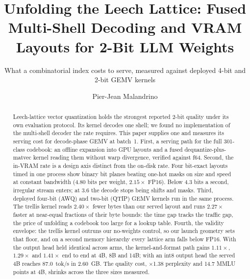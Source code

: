 \documentclass[acmsmall,screen=true,nonacm=true]{acmart}
\begin{document}
\title{Unfolding the Leech Lattice: Fused Multi-Shell Decoding and VRAM Layouts for 2-Bit LLM Weights}
\subtitle{What a combinatorial index costs to serve, measured against deployed 4-bit and 2-bit GEMV kernels}


\author{Pier-Jean Malandrino}

\renewcommand{\shortauthors}{Malandrino}

\begin{abstract}
Leech-lattice vector quantization holds the strongest reported 2-bit
quality under its own evaluation protocol. Its kernel decodes one shell; we found
no implementation of the multi-shell decoder the rate requires. This paper
supplies one and measures its serving cost for decode-phase GEMV at batch~1. First, a serving path
for the full 301-class codebook: an offline expansion into GPU layouts and
a fused dequantize-plus-matvec kernel reading them without warp divergence,
verified against f64. Second, the
in-VRAM rate is a design axis distinct from the on-disk rate. Four
bit-exact layouts timed in one process show binary bit planes beating
one-hot masks on size and speed at constant bandwidth (4.80 bits per
weight, $2.15\times$ FP16). Below 4.3 bits a second, irregular stream
enters; at 3.6 the decode stops being shifts and masks. Third,
deployed four-bit (AWQ) and two-bit (QTIP) GEMV kernels run in the same
process. The trellis kernel reads $2.40\times$ fewer bytes than our served
layout and runs $2.27\times$ faster at near-equal fractions of their byte
bounds: the time gap tracks the traffic gap, the price of unfolding a codebook too large for a lookup table. Fourth, the validity envelope: the trellis kernel outruns our
no-weights control, so our launch geometry sets that floor, and on a second memory hierarchy every lattice arm falls below FP16. With
the output head held identical across arms, the kernel-and-format path
gains $1.11\times$, $1.29\times$ and $1.41\times$ end to end at 4B, 8B
and 14B; with an int8 output head the served 4B reaches 87.0~tok/s in
2.60~GB. The quality cost, $\times$1.38 perplexity and 14.7 MMLU points at
4B, shrinks across the three sizes measured.
\end{abstract}
\end{document}
